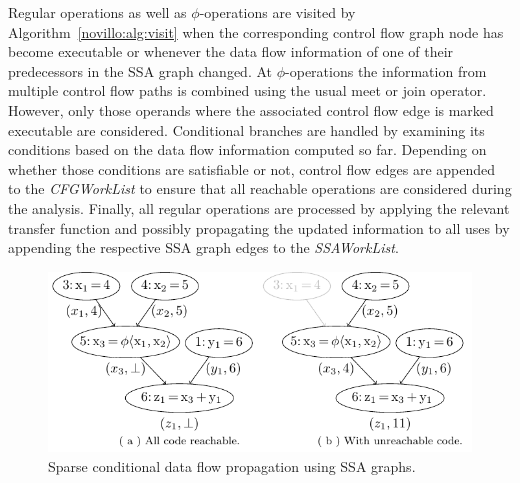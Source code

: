 Regular operations as well as $\phi$-operations are visited by
Algorithm~\ref{novillo:alg:visit} when the corresponding control flow graph node
has become executable or whenever the data flow information of one of their
predecessors in the SSA graph changed. At \linebreak $\phi$-operations the
information
from multiple control flow paths is combined using the usual meet or join
operator. However, only those operands where the associated control flow edge is
marked executable are considered. Conditional
branches are handled by examining its conditions based on the data flow
information computed so far. Depending on whether those conditions are
satisfiable or not, control flow edges are appended to the \emph{CFGWorkList} 
to ensure that all reachable operations are considered during the analysis.
Finally, all regular operations are processed by applying the relevant transfer
function and possibly propagating the updated information to all uses by
appending the respective SSA graph edges to the \emph{SSAWorkList}.

\begin{figure}[t]
  \includegraphics{ssa_propagation}
  \subfloat{\label{fig:constant_propagation_is_easier:ssa_propagation:a}}
  \subfloat{\label{fig:constant_propagation_is_easier:ssa_propagation:b}}
  \caption{Sparse conditional data flow propagation using SSA graphs.}
  \label{fig:constant_propagation_is_easier:ssa_propagation}
\end{figure}

